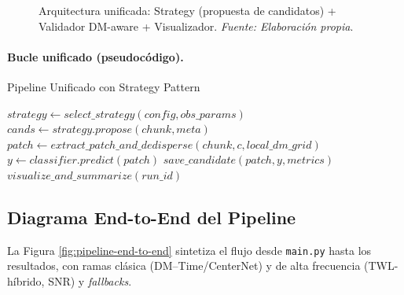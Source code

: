 \begin{figure}[h] 
\centering 
\caption{\label{fig:arquitectura-unificada} Arquitectura unificada: Strategy (propuesta de candidatos) + Validador DM-aware + Visualizador. \textit{Fuente: Elaboración propia}.} 
\end{figure}

\paragraph{Bucle unificado (pseudocódigo).} 
\begin{algorithm}[h]
\caption{Pipeline Unificado con Strategy Pattern}
\begin{algorithmic}[1]
    \State $strategy \leftarrow select\_strategy(config, obs\_params)$
        \State $cands \leftarrow strategy.propose(chunk, meta)$
            \State $patch \leftarrow extract\_patch\_and\_dedisperse(chunk, c, local\_dm\_grid)$
            \State $y \leftarrow classifier.predict(patch)$
                \State $save\_candidate(patch, y, metrics)$
            \EndIf
        \EndFor
    \EndFor
    \State $visualize\_and\_summarize(run\_id)$
\EndFunction
\end{algorithmic}
\end{algorithm}

\subsection{Diagrama End-to-End del Pipeline}

La Figura \ref{fig:pipeline-end-to-end} sintetiza el flujo desde \texttt{main.py} hasta los resultados, con ramas clásica (DM--Time/CenterNet) y de alta frecuencia (TWL-híbrido, SNR) y \textit{fallbacks}.

